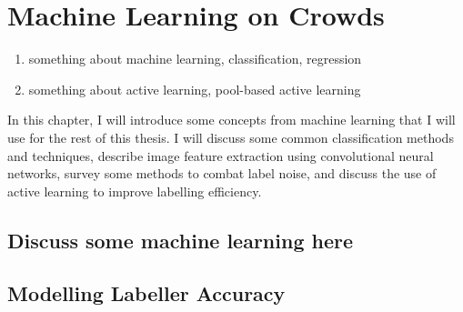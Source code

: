 \chapter{Machine Learning on Crowds}

\begin{enumerate}
    \item something about machine learning, classification, regression
    \item something about active learning, pool-based active learning
\end{enumerate}

 In this chapter, I will introduce some
concepts from machine learning that I will use for the rest of this thesis. I
will discuss some common classification methods and techniques, describe image
feature extraction using convolutional neural networks, survey some methods to
combat label noise, and discuss the use of active learning to improve labelling
efficiency.

\section{Discuss some machine learning here}

\section{Modelling Labeller Accuracy}
    
